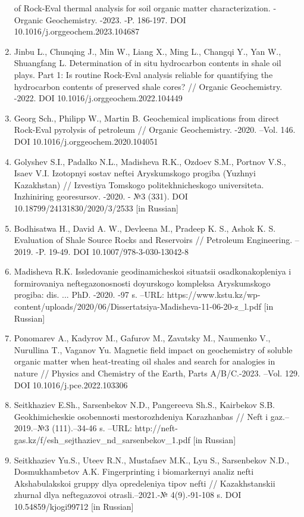 \begin{enumerate}
  of Rock-Eval thermal analysis for soil organic matter
  characterization. - Organic Geochemistry. -2023. -P. 186-197. DOI
  10.1016/j.orggeochem.2023.104687
\item
  Jinbu L., Chunqing J., Min W., Liang X., Ming L., Changqi Y., Yan W.,
  Shuangfang L. Determination of in situ hydrocarbon contents in shale
  oil plays. Part 1: Is routine Rock-Eval analysis reliable for
  quantifying the hydrocarbon contents of preserved shale cores? //
  Organic Geochemistry. -2022. DOI 10.1016/j.orggeochem.2022.104449
\item
  Georg Sch., Philipp W., Martin B. Geochemical implications from direct
  Rock-Eval pyrolysis of petroleum // Organic Geochemistry. -2020.
  --Vol. 146. DOI 10.1016/j.orggeochem.2020.104051
\item
  Golyshev S.I., Padalko N.L., Madisheva R.K., Ozdoev S.M., Portnov
  V.S., Isaev V.I. Izotopnyi sostav neftei Aryskumskogo progiba (Yuzhnyi
  Kazakhstan) // Izvestiya Tomskogo politekhnicheskogo universiteta.
  Inzhiniring georesursov. -2020. - №3 (331). DOI
  10.18799/24131830/2020/3/2533 {[}in Russian{]}
\item
  Bodhisatwa H., David A. W., Devleena M., Pradeep K. S., Ashok K. S.
  Evaluation of Shale Source Rocks and Reservoirs // Petroleum
  Engineering. --2019. -P. 19-49. DOI 10.1007/978-3-030-13042-8
\item
  Madisheva R.K. Issledovanie geodinamicheskoi situatsii
  osadkonakopleniya i formirovaniya neftegazonosnosti doyurskogo
  kompleksa Aryskumskogo progiba: dis. ... PhD. -2020. -97 s. --URL:
  https://www.kstu.kz/wp-content/uploads/2020/06/Dissertatsiya-Madisheva-11-06-20-z\_l.pdf
  {[}in Russian{]}
\item
  Ponomarev A., Kadyrov M., Gafurov M., Zavatsky M., Naumenko V.,
  Nurullina T., Vaganov Yu. Magnetic field impact on geochemistry of
  soluble organic matter when heat-treating oil shales and search for
  analogies in nature // Physics and Chemistry of the Earth, Parts
  A/B/C.-2023. --Vol. 129. DOI 10.1016/j.pce.2022.103306
\item
  Seitkhaziev E.Sh., Sarsenbekov N.D., Pangereeva Sh.S., Kairbekov S.B.
  Geokhimicheskie osobennosti mestorozhdeniya Karazhanbas //
  Neft\textquotesingle{} i gaz.--2019.--№3 (111).--34-46 s. --URL:
  http://neft-gas.kz/f/esh\_sejthaziev\_nd\_sarsenbekov\_1.pdf {[}in
  Russian{]}
\item
  Seitkhaziev Yu.S., Uteev R.N., Mustafaev M.K., Lyu S., Sarsenbekov
  N.D., Dosmukhambetov A.K. Fingerprinting i biomarkernyi analiz nefti
  Akshabulakskoi gruppy dlya opredeleniya tipov nefti // Kazakhstanskii
  zhurnal dlya neftegazovoi otrasli.--2021.-№ 4(9).-91-108 s. DOI
  10.54859/kjogi99712 {[}in Russian{]}
\end{enumerate}

